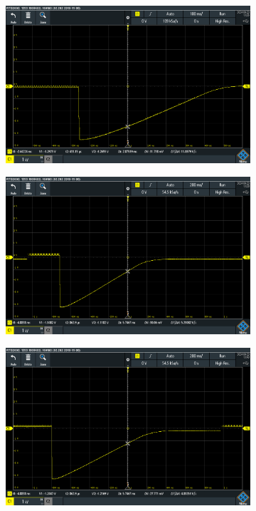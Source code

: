 \begin{figure}
	\setcounter{figure}{-1}
	\centering
	\begin{subfigure}{0.48\columnwidth}
		\setcounter{subfigure}{4}
		\centering
		\includegraphics[width=0.8\linewidth]{src/figures/oscilloscope-raw/p80-d0.png}
		\label{fig:oscilloscope-raw-p80-d0}
	\end{subfigure}
	\begin{subfigure}{0.48\columnwidth}
		\centering
		\includegraphics[width=0.8\linewidth]{src/figures/oscilloscope-raw/p80-d60.png}
		\label{fig:oscilloscope-raw-p80-d60}
	\end{subfigure}
	\begin{subfigure}{0.48\columnwidth}
		\centering
		\includegraphics[width=0.8\linewidth]{src/figures/oscilloscope-raw/p80-d80.png}

\end{subfigure}
\end{figure}
